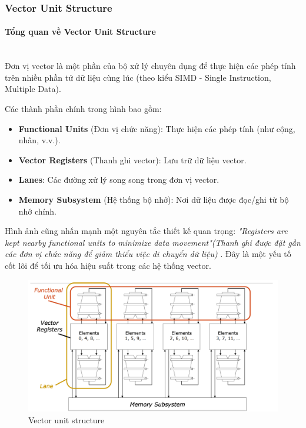 \documentclass[a4paper]{article}
\begin{document}
\subsubsection{Vector Unit Structure}
\paragraph{Tổng quan về Vector Unit Structure}\leavevmode\\

Đơn vị vector là một phần của bộ xử lý chuyên dụng để thực hiện các phép tính trên nhiều phần tử dữ liệu cùng lúc (theo kiểu SIMD - Single Instruction, Multiple Data).

Các thành phần chính trong hình bao gồm:
\begin{itemize}
    \item \textbf{Functional Units} (Đơn vị chức năng): Thực hiện các phép tính (như cộng, nhân, v.v.).
    \item \textbf{Vector Registers} (Thanh ghi vector): Lưu trữ dữ liệu vector.
    \item \textbf{Lanes}: Các đường xử lý song song trong đơn vị vector.
    \item \textbf{Memory Subsystem} (Hệ thống bộ nhớ): Nơi dữ liệu được đọc/ghi từ bộ nhớ chính.
\end{itemize}

Hình ảnh cũng nhấn mạnh một nguyên tắc thiết kế quan trọng: \textit{"Registers are kept nearby functional units to minimize data movement"(Thanh ghi được đặt gần các đơn vị chức năng để giảm thiểu việc di chuyển dữ liệu)} . Đây là một yếu tố cốt lõi để tối ưu hóa hiệu suất trong các hệ thống vector.

\begin{figure}[H]
    \centering
    \includegraphics[width=1\linewidth]{assets/vector-unit.png}
    \caption{Vector unit structure}
    \label{fig:enter-label}
\end{figure}
\end{document}
